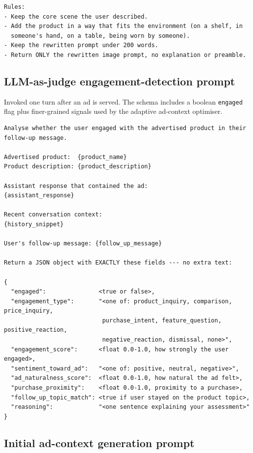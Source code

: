 \begin{appendices}
\begin{lstlisting}[style=promptstyle, caption={Image-placement prompt rewriter.}]
Rules:
- Keep the core scene the user described.
- Add the product in a way that fits the environment (on a shelf, in
  someone's hand, on a table, being worn by someone).
- Keep the rewritten prompt under 200 words.
- Return ONLY the rewritten image prompt, no explanation or preamble.
\end{lstlisting}

\subsection*{LLM-as-judge engagement-detection prompt}

Invoked one turn after an ad is served. The schema includes a boolean
\texttt{engaged} flag plus finer-grained signals used by the adaptive
ad-context optimiser.

\begin{lstlisting}[style=promptstyle, caption={Engagement / LLM-judge prompt
    (\texttt{real\_detect\_engagement}).}]
Analyse whether the user engaged with the advertised product in their
follow-up message.

Advertised product:  {product_name}
Product description: {product_description}

Assistant response that contained the ad:
{assistant_response}

Recent conversation context:
{history_snippet}

User's follow-up message: {follow_up_message}

Return a JSON object with EXACTLY these fields --- no extra text:

{
  "engaged":               <true or false>,
  "engagement_type":       "<one of: product_inquiry, comparison, price_inquiry,
                            purchase_intent, feature_question, positive_reaction,
                            negative_reaction, dismissal, none>",
  "engagement_score":      <float 0.0-1.0, how strongly the user engaged>,
  "sentiment_toward_ad":   "<one of: positive, neutral, negative>",
  "ad_naturalness_score":  <float 0.0-1.0, how natural the ad felt>,
  "purchase_proximity":    <float 0.0-1.0, proximity to a purchase>,
  "follow_up_topic_match": <true if user stayed on the product topic>,
  "reasoning":             "<one sentence explaining your assessment>"
}
\end{lstlisting}

\subsection*{Initial ad-context generation prompt}


\end{appendices}
